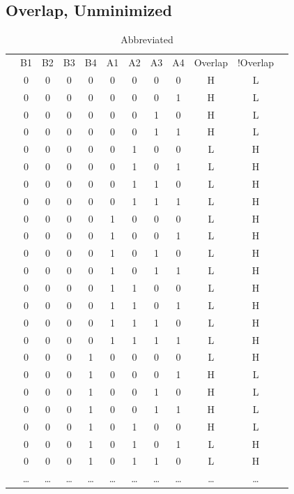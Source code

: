 \documentclass[letterpaper,titlepage,oneside]{article}
\begin{document}
\subsection*{Overlap, Unminimized}
\begin{center}
\begin{table}['h']
\begin{tabular}{c|c|c|c|c|c|c|c|c|c|c|c}
\cline{2-11}

 & B1 & B2 & B3 & B4 & A1 & A2 & A3 & A4 & Overlap & !Overlap & \\ \cline{2-11}
 & 0 & 0 & 0 & 0 & 0 & 0 & 0 & 0 & H & L &   \\
 & 0 & 0 & 0 & 0 & 0 & 0 & 0 & 1 & H & L &   \\
 & 0 & 0 & 0 & 0 & 0 & 0 & 1 & 0 & H & L &   \\
 & 0 & 0 & 0 & 0 & 0 & 0 & 1 & 1 & H & L &   \\
 & 0 & 0 & 0 & 0 & 0 & 1 & 0 & 0 & L & H &   \\
 & 0 & 0 & 0 & 0 & 0 & 1 & 0 & 1 & L & H &   \\
 & 0 & 0 & 0 & 0 & 0 & 1 & 1 & 0 & L & H &   \\
 & 0 & 0 & 0 & 0 & 0 & 1 & 1 & 1 & L & H &   \\
 & 0 & 0 & 0 & 0 & 1 & 0 & 0 & 0 & L & H &   \\
 & 0 & 0 & 0 & 0 & 1 & 0 & 0 & 1 & L & H &   \\
 & 0 & 0 & 0 & 0 & 1 & 0 & 1 & 0 & L & H &   \\
 & 0 & 0 & 0 & 0 & 1 & 0 & 1 & 1 & L & H &   \\
 & 0 & 0 & 0 & 0 & 1 & 1 & 0 & 0 & L & H &   \\
 & 0 & 0 & 0 & 0 & 1 & 1 & 0 & 1 & L & H &   \\
 & 0 & 0 & 0 & 0 & 1 & 1 & 1 & 0 & L & H &   \\
 & 0 & 0 & 0 & 0 & 1 & 1 & 1 & 1 & L & H &   \\
 & 0 & 0 & 0 & 1 & 0 & 0 & 0 & 0 & L & H &   \\
 & 0 & 0 & 0 & 1 & 0 & 0 & 0 & 1 & H & L &   \\
 & 0 & 0 & 0 & 1 & 0 & 0 & 1 & 0 & H & L &   \\
 & 0 & 0 & 0 & 1 & 0 & 0 & 1 & 1 & H & L &   \\
 & 0 & 0 & 0 & 1 & 0 & 1 & 0 & 0 & H & L &   \\
 & 0 & 0 & 0 & 1 & 0 & 1 & 0 & 1 & L & H &   \\
 & 0 & 0 & 0 & 1 & 0 & 1 & 1 & 0 & L & H &   \\
 & \ldots & \ldots & \ldots & \ldots & \ldots & \ldots & \ldots & \ldots & \ldots & \ldots &  \\

\cline{2-11}
\end{tabular}
\caption{Abbreviated}\label{table:OverLap_Unminimized}
\end{table}


\end{center}
\end{document}
